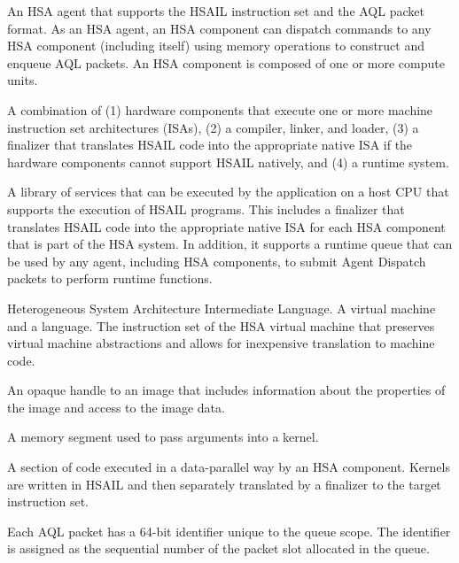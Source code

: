 \documentclass[final,oneside]{book}
\begin{document}
\begin{description}[itemsep=5pt,leftmargin=0cm, labelindent=0cm]
\item[HSA component]
  An HSA agent that supports the HSAIL instruction set and the AQL packet
  format. As an HSA agent, an HSA component can dispatch commands to any HSA
  component (including itself) using memory operations to construct and enqueue
  AQL packets. An HSA component is composed of one or more compute units.

\item[HSA implementation] A combination of (1) hardware components that execute
  one or more machine instruction set architectures (ISAs), (2) a compiler,
  linker, and loader, (3) a finalizer that translates HSAIL code into the
  appropriate native ISA if the hardware components cannot support HSAIL
  natively, and (4) a runtime system.

\item[HSA runtime] A library of services that can be executed by the application
  on a host CPU that supports the execution of HSAIL programs. This includes a
  finalizer that translates HSAIL code into the appropriate native ISA for each
  HSA component that is part of the HSA system. In addition, it supports a
  runtime queue that can be used by any agent, including HSA components, to
  submit Agent Dispatch packets to perform runtime functions.

\item[HSAIL] Heterogeneous System Architecture Intermediate Language. A virtual
  machine and a language. The instruction set of the HSA virtual machine that
  preserves virtual machine abstractions and allows for inexpensive translation
  to machine code.

\item[Image handle] An opaque handle to an image that includes information about
  the properties of the image and access to the image data.

\item[Kernarg segment] A memory segment used to pass arguments into a kernel.

\item[Kernel] A section of code executed in a data-parallel way by an HSA
  component. Kernels are written in HSAIL and then separately translated by a
  finalizer to the target instruction set.

\item[Packet ID] Each AQL packet has a 64-bit identifier unique to the queue
  scope. The identifier is assigned as the sequential number of the packet slot
  allocated in the queue.


\end{description}
\end{document}
